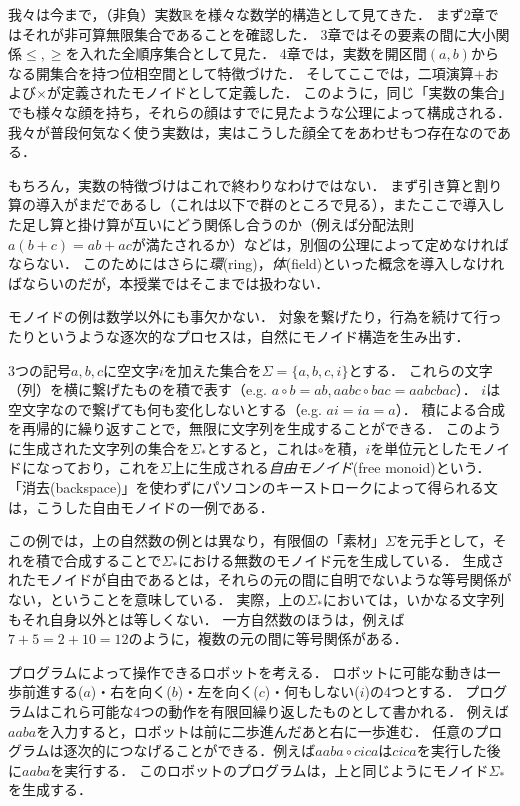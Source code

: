 \documentclass[11pt,a4paper, dvipdfmx]{jsarticle}
\begin{document}
\begin{develop}
我々は今まで，（非負）実数$\mathbb{R}$を様々な数学的構造として見てきた．
まず2章ではそれが非可算無限集合であることを確認した．
3章ではその要素の間に大小関係$\leq, \geq$を入れた全順序集合として見た．
4章では，実数を開区間$(a,b)$からなる開集合を持つ位相空間として特徴づけた．
そしてここでは，二項演算$+$および$\times$が定義されたモノイドとして定義した．
このように，同じ「実数の集合」でも様々な顔を持ち，それらの顔はすでに見たような公理によって構成される．
我々が普段何気なく使う実数は，実はこうした顔全てをあわせもつ存在なのである．

 もちろん，実数の特徴づけはこれで終わりなわけではない．
 まず引き算と割り算の導入がまだであるし（これは以下で群のところで見る），またここで導入した足し算と掛け算が互いにどう関係し合うのか（例えば分配法則$a(b+c) = ab + ac$が満たされるか）などは，別個の公理によって定めなければならない．
 このためにはさらに\emph{環}(ring)，\emph{体}(field)といった概念を導入しなければならいのだが，本授業ではそこまでは扱わない．
\end{develop}

モノイドの例は数学以外にも事欠かない．
対象を繋げたり，行為を続けて行ったりというような逐次的なプロセスは，自然にモノイド構造を生み出す．

\begin{example}[自由モノイド]
\label{ex:free_monoid}
3つの記号$a, b, c$に空文字$i$を加えた集合を$\Sigma = \{a, b, c, i \}$とする．
これらの文字（列）を横に繋げたものを積で表す（e.g. $a \circ b = ab, aabc \circ bac = aabcbac$）．
$i$は空文字なので繋げても何も変化しないとする（e.g. $ai = ia = a$）．
積による合成を再帰的に繰り返すことで，無限に文字列を生成することができる．
このように生成された文字列の集合を$\Sigma_*$とすると，これは$\circ$を積，$i$を単位元としたモノイドになっており，これを$\Sigma$上に生成される\emph{自由モノイド}(free monoid)という．
「消去(backspace)」を使わずにパソコンのキーストロークによって得られる文は，こうした自由モノイドの一例である．
\end{example}

この例では，上の自然数の例とは異なり，有限個の「素材」$\Sigma$を元手として，それを積で合成することで$\Sigma_*$における無数のモノイド元を生成している．
生成されたモノイドが自由であるとは，それらの元の間に自明でないような等号関係がない，ということを意味している．
実際，上の$\Sigma_*$においては，いかなる文字列もそれ自身以外とは等しくない．
一方自然数のほうは，例えば$7 + 5 = 2 + 10 = 12$のように，複数の元の間に等号関係がある．


\begin{example}[ロボットのプログラム]
\label{ex:robot_program}
プログラムによって操作できるロボットを考える．
ロボットに可能な動きは一歩前進する($a$)・右を向く($b$)・左を向く($c$)・何もしない($i$)の4つとする．
プログラムはこれら可能な4つの動作を有限回繰り返したものとして書かれる．
例えば$aaba$を入力すると，ロボットは前に二歩進んだあと右に一歩進む．
任意のプログラムは逐次的につなげることができる．例えば$aaba \circ cica$は$cica$を実行した後に$aaba$を実行する．
このロボットのプログラムは，上と同じようにモノイド$\Sigma_*$を生成する．
\end{example}
\end{document}
